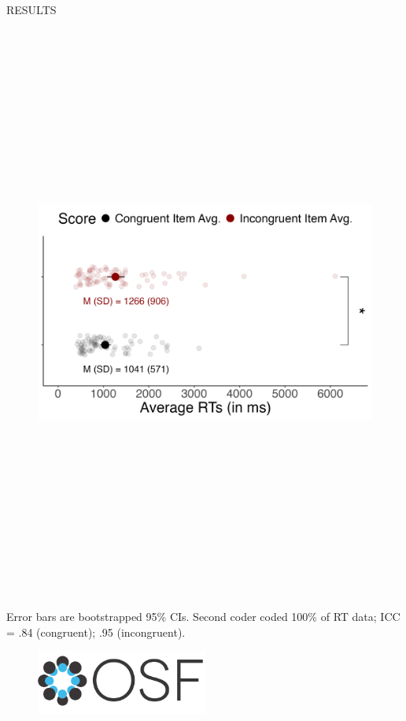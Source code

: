 \documentclass[final]{beamer}
\newlength{\colwidth}
\newlength{\widecolwidth}
\begin{document}
\begin{frame}[t]
\begin{columns}[t]
\begin{column}{\widecolwidth}
\begin{block}{RESULTS}
\begin{minipage}{0.55\textwidth}
\centering
    \begin{figure}
      \includegraphics[height=19cm]{plots/figure1.png}
    \end{figure}
{\footnotesize Error bars are bootstrapped 95\% CIs. Second coder coded 100\% of RT data; ICC = .84 (congruent); .95 (incongruent).}
\end{minipage}%
\begin{minipage}{0.45\textwidth}
\begin{figure}
      \centering
      \href{https://aspredicted.org/DJG_YWR}{\includegraphics[height=2.125cm]{images/osf.png}}

\end{figure}
\end{minipage}
\end{block}
\end{column}
\end{columns}
\end{frame}
\end{document}
